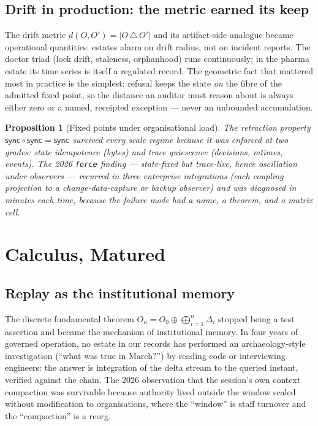 \documentclass[11pt,a4paper]{report}
\newtheorem{proposition}[theorem]{Proposition}
\theoremstyle{definition}
\theoremstyle{remark}
\newcommand{\sync}{\mathsf{sync}}
\newcommand{\del}{\Delta}
\begin{document}
\section{Drift in production: the metric earned its keep}

The drift metric $d(O, O') = |O \,\triangle\, O'|$ and its artifact-side
analogue became operational quantities: estates alarm on drift radius, not
on incident reports. The doctor triad (lock drift, staleness, orphanhood)
runs continuously; in the pharma estate its time series is itself a
regulated record. The geometric fact that mattered most in practice is the
simplest: refusal keeps the state \emph{on} the fibre of the admitted fixed
point, so the distance an auditor must reason about is always either zero
or a named, receipted exception --- never an unbounded accumulation.

\begin{proposition}[Fixed points under organisational load]
The retraction property $\sync \circ \sync = \sync$ survived every scale
regime because it was enforced at two grades: state idempotence (bytes) and
trace quiescence (decisions, mtimes, events). The 2026 \texttt{force}
finding --- state-fixed but trace-live, hence oscillation under observers ---
recurred in three enterprise integrations (each coupling projection to a
change-data-capture or backup observer) and was diagnosed in minutes each
time, because the failure mode had a name, a theorem, and a matrix cell.
\end{proposition}

\chapter{Calculus, Matured}

\section{Replay as the institutional memory}

The discrete fundamental theorem
$O_n = O_0 \oplus \bigoplus_{i=1}^{n} \del_i$ stopped being a test
assertion and became the mechanism of institutional memory. In four years
of governed operation, no estate in our records has performed an
archaeology-style investigation (``what was true in March?'') by reading
code or interviewing engineers: the answer is integration of the delta
stream to the queried instant, verified against the chain. The 2026
observation that the session's own context compaction was survivable
because authority lived outside the window scaled without modification to
organisations, where the ``window'' is staff turnover and the ``compaction''
is a reorg.
\end{document}
